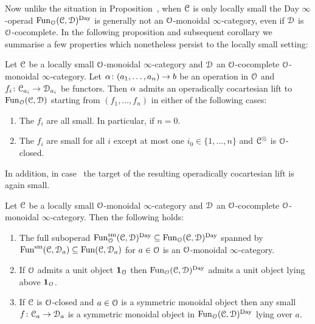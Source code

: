 Now unlike the situation in Proposition~, when $\mathcal C$ is only locally small the Day $\infty$-operad $\operatorname{Fun}_{\mathcal{O}}(\mathcal C,\mathcal{D})^{\mathrm{Day}}$ is generally not an $\mathcal{O}$-monoidal $\infty$-category, even if $\mathcal{D}$ is $\mathcal{O}$-cocomplete. In the following proposition and subsequent corollary we summarise a few properties which nonetheless persist to the locally small setting:


\begin{proposition}
\label{proposition:persist-locally-small}%
Let $\mathcal C$ be a locally small $\mathcal{O}$-monoidal $\infty$-category and $\mathcal{D}$ an $\mathcal{O}$-cocomplete $\mathcal{O}$-monoidal $\infty$-category. 
Let $\alpha\colon (a_1,\dots,a_n) \to b$ be an operation in $\mathcal{O}$ and $f_i\colon \mathcal C_{a_i} \to \mathcal{D}_{a_i}$ be functors. Then $\alpha$ admits an operadically cocartesian lift to $\operatorname{Fun}_{\mathcal{O}}(\mathcal C,\mathcal{D})$ starting from $(f_1,...,f_n)$ in either of the following cases:
\begin{enumerate}
\item
\label{item:all-small}%
The $f_i$ are all small. In particular, if $n=0$.
\item
The $f_i$ are small for all $i$ except at most one $i_0 \in \{1,...,n\}$ and $\mathcal C^{\otimes}$ is $\mathcal{O}$-closed.
\end{enumerate}
In addition, in case~ the target of the resulting operadically cocartesian lift is again small.
\end{proposition}

\begin{corollary}
\label{corollary:persist-locally-small}%
Let $\mathcal C$ be a locally small $\mathcal{O}$-monoidal $\infty$-category and $\mathcal{D}$ an $\mathcal{O}$-cocomplete $\mathcal{O}$-monoidal $\infty$-category. Then the following holds:
\begin{enumerate}
\item
The full suboperad $\operatorname{Fun}_{\mathcal{O}}^{\mathrm{sm}}(\mathcal C,\mathcal{D})^{\mathrm{Day}} \subseteq \operatorname{Fun}_{\mathcal{O}}(\mathcal C,\mathcal{D})^{\mathrm{Day}}$ spanned by $\operatorname{Fun}^{\mathrm{sm}}(\mathcal C,\mathcal{D}_a) \subseteq \operatorname{Fun}(\mathcal C,\mathcal{D}_a)$ for $a \in \mathcal{O}$ is an $\mathcal{O}$-monoidal $\infty$-category.
\item
If $\mathcal{O}$ admits a unit object $\mathbf{1}_{\mathcal{O}}$ then $\operatorname{Fun}_{\mathcal{O}}(\mathcal C,\mathcal{D})^{\mathrm{Day}}$ admits a unit object lying above $\mathbf{1}_{\mathcal{O}}$.
\item
\label{item:small-monoidal}%
If $\mathcal C$ is $\mathcal{O}$-closed and $a \in \mathcal{O}$ is a symmetric monoidal object then any small $f\colon \mathcal C_a \to \mathcal{D}_a$ is a symmetric monoidal object in $\operatorname{Fun}_{\mathcal{O}}(\mathcal C,\mathcal{D})^{\mathrm{Day}}$ lying over $a$.
\end{enumerate}
\end{corollary}


